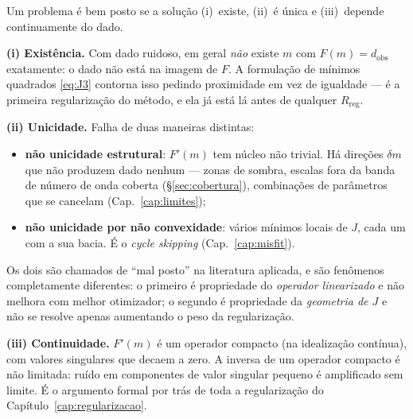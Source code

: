 \documentclass[11pt,a4paper,oneside]{report}
\begin{document}
\begin{teoria}
Um problema \'e bem posto se a solu\c{c}\~ao (i)~existe, (ii)~\'e \'unica e
(iii)~depende continuamente do dado.

\textbf{(i) Exist\^encia.} Com dado ruidoso, em geral \emph{n\~ao} existe $m$
com $F(m) = d_{\text{obs}}$ exatamente: o dado n\~ao est\'a na imagem de $F$.
A formula\c{c}\~ao de m\'inimos quadrados \eqref{eq:J3} contorna isso pedindo
proximidade em vez de igualdade --- \'e a primeira regulariza\c{c}\~ao do
m\'etodo, e ela j\'a est\'a l\'a antes de qualquer $R_{\text{reg}}$.

\textbf{(ii) Unicidade.} Falha de duas maneiras distintas:
\begin{itemize}[leftmargin=*, itemsep=1pt]
\item \textbf{n\~ao unicidade estrutural}: $F'(m)$ tem n\'ucleo n\~ao trivial.
H\'a dire\c{c}\~oes $\delta m$ que n\~ao produzem dado nenhum --- zonas de
sombra, escalas fora da banda de n\'umero de onda coberta
(§\ref{sec:cobertura}), combina\c{c}\~oes de par\^ametros que se cancelam
(Cap.~\ref{cap:limites});
\item \textbf{n\~ao unicidade por n\~ao convexidade}: v\'arios m\'inimos
locais de $J$, cada um com a sua bacia. \'E o \emph{cycle skipping}
(Cap.~\ref{cap:misfit}).
\end{itemize}
Os dois s\~ao chamados de ``mal posto'' na literatura aplicada, e s\~ao
fen\^omenos completamente diferentes: o primeiro \'e propriedade do
\emph{operador linearizado} e n\~ao melhora com melhor otimizador; o segundo
\'e propriedade da \emph{geometria de $J$} e n\~ao se resolve apenas
aumentando o peso da regulariza\c{c}\~ao.

\textbf{(iii) Continuidade.} $F'(m)$ \'e um operador compacto (na
idealiza\c{c}\~ao cont\'inua), com valores singulares que decaem a zero. A
inversa de um operador compacto \'e n\~ao limitada: ru\'ido em componentes de
valor singular pequeno \'e amplificado sem limite. \'E o argumento formal por
tr\'as de toda a regulariza\c{c}\~ao do Cap\'itulo~\ref{cap:regularizacao}.
\end{teoria}
\end{document}
